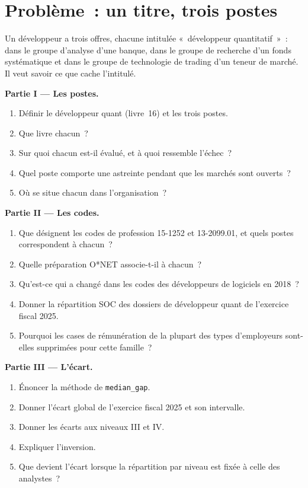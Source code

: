 \section{Problème~: un titre, trois postes}

\begin{problem}\label{pb:in:quant-developer:1}
Un développeur a trois offres, chacune intitulée «~développeur quantitatif~»~: dans le groupe d'analyse d'une banque, dans le groupe de recherche d'un fonds
systématique et dans le groupe de technologie de trading d'un teneur de marché. Il veut savoir ce que cache l'intitulé.

\medskip\noindent\textbf{Partie I --- Les postes.}
\begin{enumerate}
\item Définir le développeur quant (livre~16) et les trois postes.
\item Que livre chacun~?
\item Sur quoi chacun est-il évalué, et à quoi ressemble l'échec~?
\item Quel poste comporte une astreinte pendant que les marchés sont ouverts~?
\item Où se situe chacun dans l'organisation~?
\end{enumerate}

\medskip\noindent\textbf{Partie II --- Les codes.}
\begin{enumerate}[resume]
\item Que désignent les codes de profession 15-1252 et 13-2099.01, et quels postes correspondent à chacun~?
\item Quelle préparation O*NET associe-t-il à chacun~?
\item Qu'est-ce qui a changé dans les codes des développeurs de logiciels en 2018~?
\item Donner la répartition SOC des dossiers de développeur quant de l'exercice fiscal 2025.
\item Pourquoi les cases de rémunération de la plupart des types d'employeurs sont-elles supprimées pour cette famille~?
\end{enumerate}

\medskip\noindent\textbf{Partie III --- L'écart.}
\begin{enumerate}[resume]
\item Énoncer la méthode de \texttt{median\_gap}.
\item Donner l'écart global de l'exercice fiscal 2025 et son intervalle.
\item Donner les écarts aux niveaux III et IV.
\item Expliquer l'inversion.
\item Que devient l'écart lorsque la répartition par niveau est fixée à celle des analystes~?
\end{enumerate}


\end{problem}
